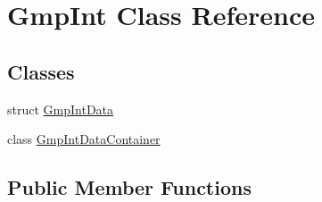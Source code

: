 \hypertarget{class_gmp_int}{}\section{Gmp\+Int Class Reference}
\label{class_gmp_int}
\subsection*{Classes}
\begin{DoxyCompactItemize}
\item 
struct \hyperlink{struct_gmp_int_1_1_gmp_int_data}{Gmp\+Int\+Data}
\item 
class \hyperlink{class_gmp_int_1_1_gmp_int_data_container}{Gmp\+Int\+Data\+Container}
\end{DoxyCompactItemize}
\subsection*{Public Member Functions}
